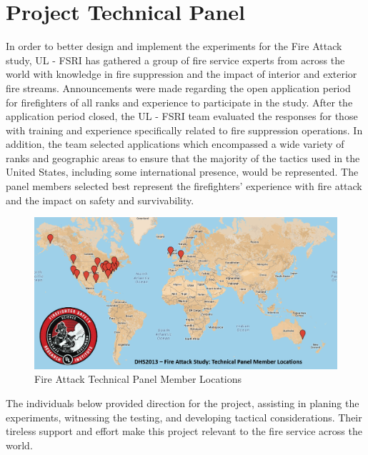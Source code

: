 \documentclass{article}
\begin{document}
\clearpage

\section{Project Technical Panel}

In order to better design and implement the experiments for the Fire Attack study, UL - FSRI has gathered a group of fire service experts from across the world with knowledge in fire suppression and the impact of interior and exterior fire streams. Announcements were made regarding the open application period for firefighters of all ranks and experience to participate in the study. After the application period closed, the UL - FSRI team evaluated the responses for those with training and experience specifically related to fire suppression operations. In addition, the team selected applications which encompassed a wide variety of ranks and geographic areas to ensure that the majority of the tactics used in the United States, including some international presence, would be represented. The panel members selected best represent the firefighters' experience with fire attack and the impact on safety and survivability.

\begin{figure}[H]
	\centering
	\includegraphics[width = 5in]{Figures/General/Technical_Panel_Logos.png} 
	\caption{Fire Attack Technical Panel Member Locations}
	\label{fig:PanelLocatoins}
\end{figure} 

\clearpage

The individuals below provided direction for the project, assisting in planing the experiments, witnessing the testing, and developing tactical considerations. Their tireless support and effort make this project relevant to the fire service across the world. 

\renewcommand{\arraystretch}{1.5}
\end{document}
